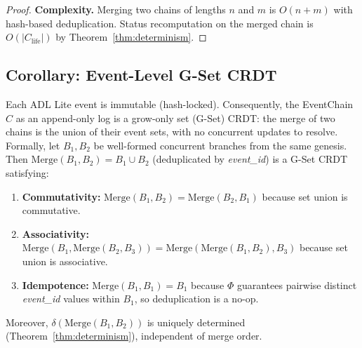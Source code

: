 \begin{proof}
\textbf{Complexity.} Merging two chains of lengths $n$ and $m$ is $O(n + m)$ with hash-based deduplication. Status recomputation on the merged chain is $O(|C_{\text{life}}|)$ by Theorem~\ref{thm:determinism}.
\end{proof}

\subsection{Corollary: Event-Level G-Set CRDT}

\begin{corollary}\label{cor:gset-crdt}
Each ADL Lite event is immutable (hash-locked). Consequently, the EventChain $C$ as an append-only log is a grow-only set (G-Set) CRDT: the merge of two chains is the union of their event sets, with no concurrent updates to resolve. Formally, let $B_1, B_2$ be well-formed concurrent branches from the same genesis. Then $\text{Merge}(B_1, B_2) = B_1 \cup B_2$ (deduplicated by \textit{event\_id}) is a G-Set CRDT satisfying:
\begin{enumerate}[label=(\roman*)]
    \item \textbf{Commutativity:} $\text{Merge}(B_1, B_2) = \text{Merge}(B_2, B_1)$ because set union is commutative.
    \item \textbf{Associativity:} $\text{Merge}(B_1, \text{Merge}(B_2, B_3)) = \text{Merge}(\text{Merge}(B_1, B_2), B_3)$ because set union is associative.
    \item \textbf{Idempotence:} $\text{Merge}(B_1, B_1) = B_1$ because $\Phi$ guarantees pairwise distinct \textit{event\_id} values within $B_1$, so deduplication is a no-op.
\end{enumerate}
Moreover, $\delta(\text{Merge}(B_1, B_2))$ is uniquely determined (Theorem~\ref{thm:determinism}), independent of merge order.
\end{corollary}

